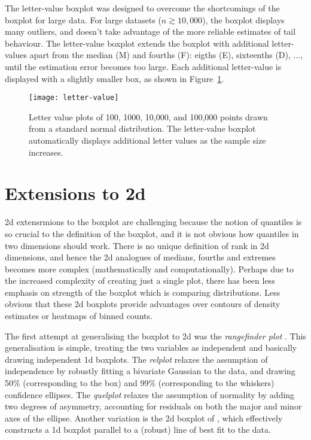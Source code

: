 \documentclass[oneside]{article}
\begin{document}
The letter-value boxplot \citep{hofmann:2006a} was designed to overcome the shortcomings of the boxplot for large data. For large datasets ($n \gtrsim 10,000$), the boxplot displays many outliers, and doesn't take advantage of the more reliable estimates of tail behaviour. The letter-value boxplot extends the boxplot with additional letter-values apart from the median (M) and fourths (F): eigths (E), sixteenths (D), ..., until the estimation error becomes too large. Each additional letter-value is displayed with a slightly smaller box, as shown in Figure~\ref{fig:letter-value}.

\begin{figure}[htbp]
  \centering
  \texttt{[image: letter-value]}
  \caption{Letter value plots of 100, 1000, 10,000, and 100,000 points drawn from a standard normal distribution.  The letter-value boxplot automatically displays additional letter values as the sample size increases.}
  \label{fig:letter-value}
\end{figure}

\section{Extensions to 2d}
\label{sec:2d}

2d extensrmions to the boxplot are challenging because the notion of quantiles is so crucial to the definition of the boxplot, and it is not obvious how quantiles in two dimensions should work. There is no unique definition of rank in 2d dimensions, and hence the 2d analogues of medians, fourths and extremes becomes more complex (mathematically and computationally). Perhaps due to the increased complexity of creating just a single plot, there has been less emphasis on strength of the boxplot which is comparing distributions. Less obvious that these 2d boxplots provide advantages over contours of density estimates or heatmaps of binned counts.

The first attempt at generalising the boxplot to 2d was the \emph{rangefinder plot} \citep{becketti:1987}. This generalisation is simple, treating the two variables as independent and basically drawing independent 1d boxplots. The \emph{relplot} \citep{goldberg:1992} relaxes the assumption of independence by robustly fitting a bivariate Gaussian to the data, and drawing 50\% (corresponding to the box) and 99\% (corresponding to the whiskers) confidence ellipses. The \emph{quelplot}\citep{goldberg:1992} relaxes the assumption of normality by adding two degrees of asymmetry, accounting for residuals on both the major and minor axes of the ellipse. Another variation is the 2d boxplot of \citet{tongkumchum:2005}, which effectively constructs a 1d boxplot parallel to a (robust) line of best fit to the data.
\end{document}
